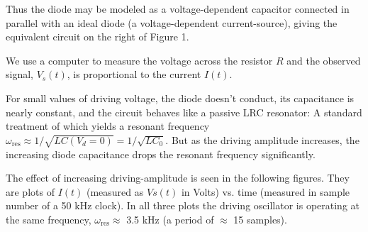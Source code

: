 \documentclass{../lab}
\begin{document}
Thus the diode may be modeled as a voltage-dependent capacitor connected in parallel with an ideal diode (a voltage-dependent current-source), giving the equivalent circuit on the right of Figure 1.

We use a computer to measure the voltage across the resistor $R$ and the observed signal, $V_s(t)$, is proportional to the current $I(t)$.

For small values of driving voltage, the diode doesn't conduct, its capacitance is nearly constant, and the circuit behaves like a passive LRC resonator: A standard treatment of which yields a resonant frequency $\omega_\text{res} \approx 1/\sqrt{LC( V_d = 0)} = 1/\sqrt{LC_0}$. But as the driving amplitude increases, the increasing diode capacitance drops the resonant frequency significantly.

The effect of increasing driving-amplitude is seen in the following figures. They are plots of $I(t)$ (measured as $Vs(t)$ in Volts) vs. time (measured in sample number of a 50 kHz clock). In all three plots the driving oscillator is operating at the same frequency, $\omega_\text{res} \approx$ 3.5 kHz (a period of $\approx$ 15 samples).
\end{document}
